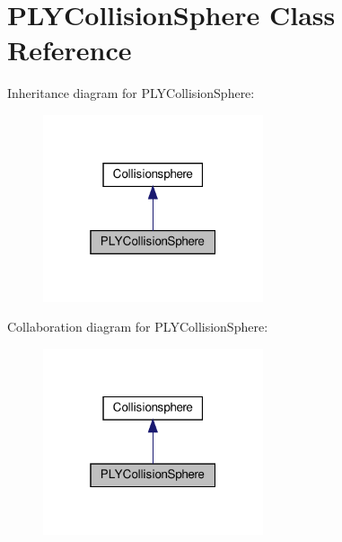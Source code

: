 \hypertarget{class_p_l_y_collision_sphere}{}\section{P\+L\+Y\+Collision\+Sphere Class Reference}
\label{class_p_l_y_collision_sphere}


Inheritance diagram for P\+L\+Y\+Collision\+Sphere\+:
\nopagebreak
\begin{figure}[H]
\begin{center}
\leavevmode
\includegraphics[width=184pt]{class_p_l_y_collision_sphere__inherit__graph}
\end{center}
\end{figure}


Collaboration diagram for P\+L\+Y\+Collision\+Sphere\+:
\nopagebreak
\begin{figure}[H]
\begin{center}
\leavevmode
\includegraphics[width=184pt]{class_p_l_y_collision_sphere__coll__graph}
\end{center}
\end{figure}
